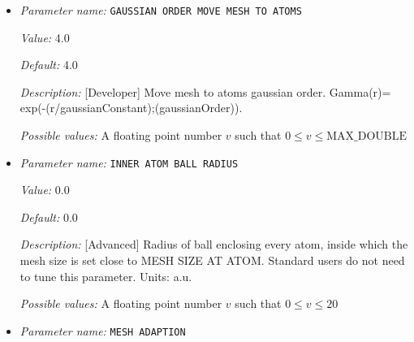 \begin{itemize}
{\it Value:} 4.0


{\it Default:} 4.0


{\it Description:} [Developer] Force computation generator gaussian order. Also used for mesh movement. Gamma(r)= exp(-(r/gaussianConstant);(gaussianOrder)).


{\it Possible values:} A floating point number $v$ such that $0 \leq v \leq \text{MAX\_DOUBLE}$
\item {\it Parameter name:} {\tt GAUSSIAN ORDER MOVE MESH TO ATOMS}
\label{parameters:Finite element mesh parameters/Auto mesh generation parameters/GAUSSIAN ORDER MOVE MESH TO ATOMS}
\label{parameters:Finite_20element_20mesh_20parameters/Auto_20mesh_20generation_20parameters/GAUSSIAN_20ORDER_20MOVE_20MESH_20TO_20ATOMS}


{\it Value:} 4.0


{\it Default:} 4.0


{\it Description:} [Developer] Move mesh to atoms gaussian order. Gamma(r)= exp(-(r/gaussianConstant);(gaussianOrder)).


{\it Possible values:} A floating point number $v$ such that $0 \leq v \leq \text{MAX\_DOUBLE}$
\item {\it Parameter name:} {\tt INNER ATOM BALL RADIUS}
\label{parameters:Finite element mesh parameters/Auto mesh generation parameters/INNER ATOM BALL RADIUS}
\label{parameters:Finite_20element_20mesh_20parameters/Auto_20mesh_20generation_20parameters/INNER_20ATOM_20BALL_20RADIUS}


{\it Value:} 0.0


{\it Default:} 0.0


{\it Description:} [Advanced] Radius of ball enclosing every atom, inside which the mesh size is set close to MESH SIZE AT ATOM. Standard users do not need to tune this parameter. Units: a.u.


{\it Possible values:} A floating point number $v$ such that $0 \leq v \leq 20$
\item {\it Parameter name:} {\tt MESH ADAPTION}
\label{parameters:Finite element mesh parameters/Auto mesh generation parameters/MESH ADAPTION}
\label{parameters:Finite_20element_20mesh_20parameters/Auto_20mesh_20generation_20parameters/MESH_20ADAPTION}



\end{itemize}
